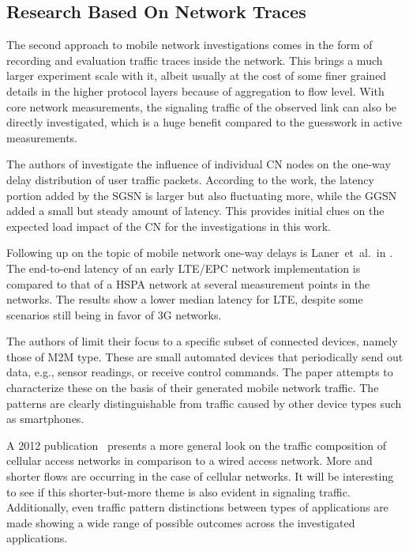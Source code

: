 \subsection{Research Based On Network Traces}

The second approach to mobile network investigations comes in the form of recording and evaluation traffic traces inside the network. This brings a much larger experiment scale with it, albeit usually at the cost of some finer grained details in the higher protocol layers because of aggregation to flow level. With core network measurements, the signaling traffic of the observed link can also be directly investigated, which is a huge benefit compared to the guesswork in active measurements.

The authors of \cite{4675847} investigate the influence of individual \gls{CN} nodes on the one-way delay distribution of user traffic packets. According to the work, the latency portion added by the \gls{SGSN} is larger but also fluctuating more, while the \gls{GGSN} added a small but steady amount of latency. This provides initial clues on the expected load impact of the \gls{CN} for the investigations in this work.

Following up on the topic of mobile network one-way delays is Laner~et~al.\ in \cite{laner2012delaycomparison}. The end-to-end latency of an early \gls{LTE}/\gls{EPC} network implementation is compared to that of a \gls{HSPA} network at several measurement points in the networks. The results show a lower median latency for \gls{LTE}, despite some scenarios still being in favor of \gls{3G} networks.

The authors of \cite{Shafiq:2012:FLC:2254756.2254767} limit their focus to a specific subset of connected devices, namely those of \gls{M2M} type. These are small automated devices that periodically send out data, e.g., sensor readings, or receive control commands. The paper attempts to characterize these on the basis of their generated mobile network traffic. The patterns are clearly distinguishable from traffic caused by other device types such as smartphones.

A 2012 publication~\cite{Zhang:2012:UCC:2377677.2377764} presents a more general look on the traffic composition of cellular access networks in comparison to a wired access network. More and shorter flows are occurring in the case of cellular networks. It will be interesting to see if this shorter-but-more theme is also evident in signaling traffic. Additionally, even traffic pattern distinctions between types of applications are made showing a wide range of possible outcomes across the investigated applications.

